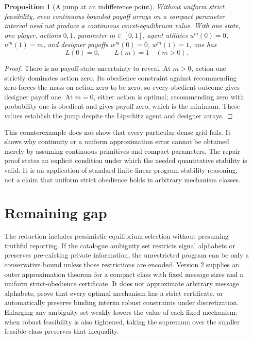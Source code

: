 \documentclass[11pt]{article}
\newtheorem{proposition}[theorem]{Proposition}
\theoremstyle{definition}
\theoremstyle{remark}
\begin{document}
\begin{proposition}[A jump at an indifference point]
Without uniform strict feasibility, even continuous bounded payoff
arrays on a compact parameter interval need not produce a continuous
worst-equilibrium value. With one state, one player, actions $0,1$,
parameter $m\in[0,1]$, agent utilities $u^m(0)=0$, $u^m(1)=m$,
and designer payoffs $w^m(0)=0$, $w^m(1)=1$, one has
\[
 L(0)=0,\qquad L(m)=1\quad(m>0).
\]
\end{proposition}
\begin{proof}
There is no payoff-state uncertainty to reveal. At $m>0$, action one
strictly dominates action zero. Its obedience constraint against
recommending zero forces the mass on action zero to be zero, so every
obedient outcome gives designer payoff one. At $m=0$, either action
is optimal; recommending zero with probability one is obedient and
gives payoff zero, which is the minimum. These values establish the
jump despite the Lipschitz agent and designer arrays.
\end{proof}
This counterexample does not show that every particular dense grid
fails. It shows why continuity or a uniform approximation error cannot
be obtained merely by assuming continuous primitives and compact
parameters. The repair proof states an explicit condition under which
the needed quantitative stability is valid. It is an application of
standard finite linear-program stability reasoning, not a claim that
uniform strict obedience holds in arbitrary mechanism classes.

\section{Remaining gap}
The reduction includes pessimistic equilibrium selection without presuming truthful reporting. If the catalogue ambiguity set restricts signal alphabets or preserves pre-existing private information, the unrestricted program can be only a conservative bound unless those restrictions are encoded. Version 2 supplies an outer approximation theorem for a compact class with fixed message sizes and a uniform strict-obedience certificate. It does not approximate arbitrary message alphabets, prove that every optimal mechanism has a strict certificate, or automatically preserve binding interim robust constraints under discretization. Enlarging any ambiguity set weakly lowers the value of each fixed mechanism; when robust feasibility is also tightened, taking the supremum over the smaller feasible class preserves that inequality.
\end{document}
